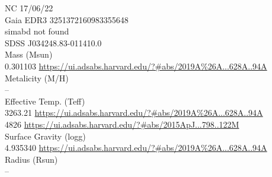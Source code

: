 NC 17/06/22\\
Gaia EDR3 3251372160983355648\\
simabd not found \\

SDSS J034248.83-011410.0\\
Mass (Msun)\\
0.301103 \url{https://ui.adsabs.harvard.edu/?#abs/2019A%26A...628A..94A}\\
Metalicity (M/H)\\
--\\
Effective Temp. (Teff)\\
3263.21 \url{https://ui.adsabs.harvard.edu/?#abs/2019A%26A...628A..94A}\\
4826 \url{https://ui.adsabs.harvard.edu/?#abs/2015ApJ...798..122M}\\
Surface Gravity (logg)\\
4.935340 \url{https://ui.adsabs.harvard.edu/?#abs/2019A%26A...628A..94A}\\
Radius (Rsun)\\
--\\
